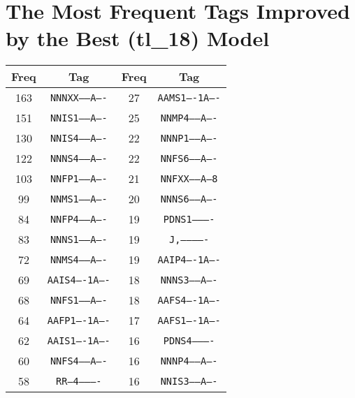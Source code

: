 \section{The Most Frequent Tags Improved by the Best (tl\_18) Model}
\label{att:tags1}
\begin{table}[!h]
\centering
\begin{tabular}{|c|c||c|c|}
\hline
Freq & Tag & Freq & Tag \\ \hline \hline
163 & \texttt{NNNXX-----A----} & 27 & \texttt{AAMS1----1A----}                         \\
151 & \texttt{NNIS1-----A----} & 25 & \texttt{NNMP4-----A----}                         \\
130 & \texttt{NNIS4-----A----} & 22 & \texttt{NNNP1-----A----}                         \\
122 & \texttt{NNNS4-----A----} & 22 & \texttt{NNFS6-----A----}                         \\
103 & \texttt{NNFP1-----A----} & 21 & \texttt{NNFXX-----A---8}                         \\
99  & \texttt{NNMS1-----A----} & 20 & \texttt{NNNS6-----A----}                         \\
84  & \texttt{NNFP4-----A----} & 19 & \texttt{PDNS1----------}                         \\
83  & \texttt{NNNS1-----A----} & 19 & \texttt{J,-------------}                         \\
72  & \texttt{NNMS4-----A----} & 19 & \texttt{AAIP4----1A----}                         \\
69  & \texttt{AAIS4----1A----} & 18 & \texttt{NNNS3-----A----}                         \\
68  & \texttt{NNFS1-----A----} & 18 & \texttt{AAFS4----1A----}                         \\
64  & \texttt{AAFP1----1A----} & 17 & \texttt{AAFS1----1A----}                         \\
62  & \texttt{AAIS1----1A----} & 16 & \texttt{PDNS4----------}                         \\
60  & \texttt{NNFS4-----A----} & 16 & \texttt{NNNP4-----A----}                         \\
58  & \texttt{RR--4----------} & 16 & \texttt{NNIS3-----A----}                         \\

\end{tabular}
\end{table}
